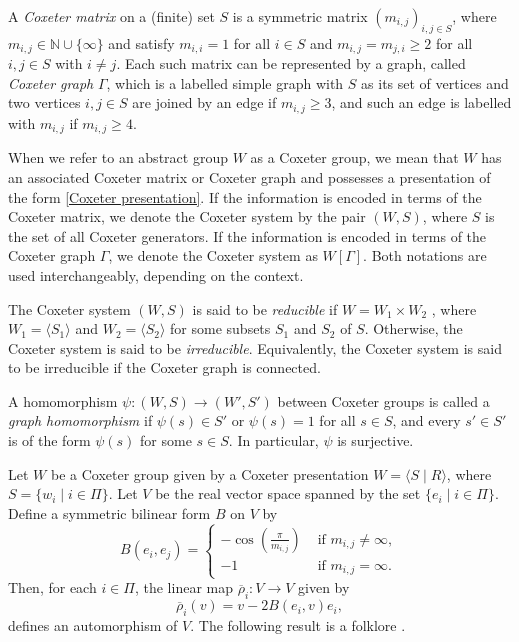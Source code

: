 \documentclass[12pt]{amsart}
\theoremstyle{definition}
\numberwithin{equation}{section}
\begin{document}
 A {\it Coxeter matrix} on a (finite) set $S$ is a symmetric matrix $(m_{i,j})_{i,j\in S}$, where $m_{i,j} \in \mathbb{N} \cup\{\infty\}$ and satisfy $m_{i,i}=1$ for all $i\in S$ and $m_{i,j}=m_{j,i}\ge2$ for all $i,j\in S$ with $i\neq j$. Each such matrix can be represented by a graph, called {\it Coxeter graph} $\Gamma$, which is a labelled simple graph with $S$ as its set of vertices and two vertices $i,j \in S$ are joined by an edge if $m_{i,j}\ge3$, and such an edge is labelled with $m_{i,j}$ if $m_{i,j}\ge 4$. 

\par 

When we refer to an abstract group $W$ as a Coxeter group, we mean that $W$ has an associated Coxeter matrix or Coxeter graph and possesses a presentation of the form \eqref{Coxeter presentation}.  If the information is encoded in terms of the Coxeter matrix, we denote the Coxeter system by the pair $ (W, S) $, where $ S $ is the set of all Coxeter generators. If the information is encoded in terms of the Coxeter graph $ \Gamma $, we denote the Coxeter system as $W[\Gamma] $. Both notations are used interchangeably, depending on the context. 
\par
The Coxeter system $(W , S)$ is said to be {\it reducible} if $W = W_1 \times W_2$ , where $W_1 = \langle S_1 \rangle$ and $W_2 = \langle S_2\rangle $ for some subsets $S_1$ and $S_2$ of $S$. Otherwise, the Coxeter system is said to be {\it irreducible}. Equivalently, the Coxeter system is said to be irreducible if the Coxeter graph is connected.
\par

A homomorphism  $\psi:(W,S)\to (W',S')$  between Coxeter groups is called a {\it graph homomorphism} if $\psi(s)\in S'$ or $\psi(s)=1$ for all $s\in S$, and every $s'\in S'$ is of the form $\psi(s)$ for some $s\in S$. In particular, $\psi$ is surjective.
\par
Let $W$ be a Coxeter group given by a Coxeter presentation $W= \langle S \mid R \rangle $, where $S= \{ w_i \mid i \in \Pi\}$. Let $V$ be the real vector space spanned by the set $\{e_i \mid i \in \Pi \}$. Define a symmetric bilinear form $B$ on $V$ by
$$
B\left(e_{i}, e_{j}\right)= \begin{cases}-\cos \left(\frac{\pi}{m_{i, j}}\right) & \text { if } m_{i, j} \neq \infty, \\ -1 & \text { if } m_{i, j}=\infty. \end{cases}
$$
Then, for each $i \in \Pi$, the linear map $\overline{\rho}_{i}: V \rightarrow V$ given by 
\begin{equation}\label{Tits representation formula}
\overline{\rho}_{i}(v)=v-2 B\left(e_{i}, v\right) e_{i},
\end{equation}
 defines an automorphism of $V$. The following result is a folklore \cite[Chapter V, Section 4]{Bourbaki}.
\end{document}
